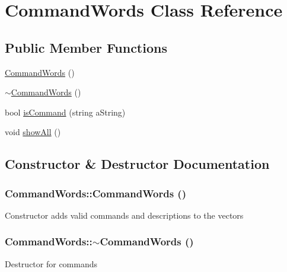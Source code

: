 \hypertarget{classCommandWords}{
\section{CommandWords Class Reference}
\label{d0/dda/classCommandWords}
}
\subsection*{Public Member Functions}
\begin{DoxyCompactItemize}
\item 
\hyperlink{classCommandWords_a778ed5312468a58785c55e4df67fe8c2}{CommandWords} ()
\item 
\hyperlink{classCommandWords_a9802c2d1589170dde629f70015848253}{$\sim$CommandWords} ()
\item 
bool \hyperlink{classCommandWords_a462e98022a37c1699c14d45ab59c3f3f}{isCommand} (string aString)
\item 
void \hyperlink{classCommandWords_aa449001a267676b74f1aacd89a6f84a4}{showAll} ()
\end{DoxyCompactItemize}


\subsection{Constructor \& Destructor Documentation}
\hypertarget{classCommandWords_a778ed5312468a58785c55e4df67fe8c2}{
\subsubsection[{CommandWords}]{\setlength{\rightskip}{0pt plus 5cm}CommandWords::CommandWords ()}}
\label{d0/dda/classCommandWords_a778ed5312468a58785c55e4df67fe8c2}
Constructor adds valid commands and descriptions to the vectors \hypertarget{classCommandWords_a9802c2d1589170dde629f70015848253}{
\subsubsection[{$\sim$CommandWords}]{\setlength{\rightskip}{0pt plus 5cm}CommandWords::$\sim$CommandWords ()}}
\label{d0/dda/classCommandWords_a9802c2d1589170dde629f70015848253}
Destructor for commands 

